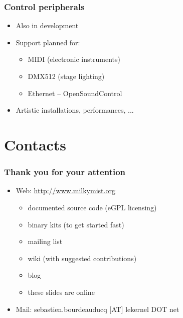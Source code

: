\documentclass{beamer}
\begin{document}
\frame
{
  \frametitle{Control peripherals}
  
  \begin{itemize}
  \item Also in development
  \item Support planned for:
  \begin{itemize}
  \item MIDI (electronic instruments)
  \item DMX512 (stage lighting)
  \item Ethernet -- OpenSoundControl
  \end{itemize}
  \item Artistic installations, performances, ...
  \end{itemize}
}


\section{Contacts}
\frame
{
  \frametitle{Thank you for your attention}
  \begin{itemize}
  \item Web: \url{http://www.milkymist.org}
  \begin{itemize}
  \item documented source code (eGPL licensing)
  \item binary kits (to get started fast)
  \item mailing list
  \item wiki (with suggested contributions)
  \item blog
  \item these slides are online
  \end{itemize}
  \item Mail: sebastien.bourdeauducq [AT] lekernel DOT net
  \end{itemize}

  \begin{center}
  \end{center}
}
\end{document}
